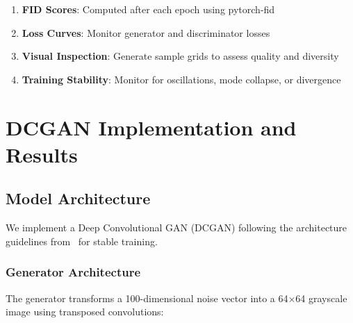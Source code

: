 \documentclass[conference,12pt]{IEEEtran}
\begin{document}
\begin{enumerate}
    \item \textbf{FID Scores}: Computed after each epoch using pytorch-fid
    \item \textbf{Loss Curves}: Monitor generator and discriminator losses
    \item \textbf{Visual Inspection}: Generate sample grids to assess quality and diversity
    \item \textbf{Training Stability}: Monitor for oscillations, mode collapse, or divergence
\end{enumerate}

\section{DCGAN Implementation and Results}

\subsection{Model Architecture}

We implement a Deep Convolutional GAN (DCGAN) following the architecture guidelines from~\cite{radford2016unsupervised} for stable training.

\subsubsection{Generator Architecture}

The generator transforms a 100-dimensional noise vector into a 64×64 grayscale image using transposed convolutions:
\end{document}
